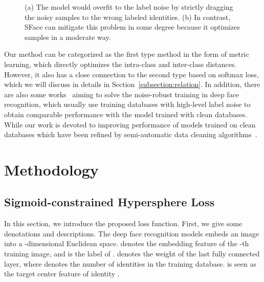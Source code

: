 \documentclass[journal,comsoc]{IEEEtran}
\begin{document}
\begin{figure}[htbp]
	\centering
	\caption{(a) The model would overfit to the label noise by strictly dragging the noisy samples to the wrong labeled identities. (b) In contrast, SFace can mitigate this problem in some degree because it optimizes samples in a moderate way.}
	\label{fig:intro_noise}
\end{figure}

Our method can be categorized as the first type method in the form of metric learning, which directly optimizes the intra-class and inter-class distances. However, it also has a close connection to the second type based on softmax loss, which we will discuss in details in Section~\ref{subsection:relation}. In addition, there are also some works~\cite{Hu_2019_CVPR,Wang_2019_ICCV} aiming to solve the noise-robust training in deep face recognition, which usually use training databases with high-level label noise to obtain comparable performance with the model trained with clean databases. While our work is devoted to improving performance of models trained on clean databases which have been refined by semi-automatic data cleaning algorithms~\cite{Yi2014CASIA,Cao18,deng2019arcface}.

\section{Methodology}
\label{sec:method}
\subsection{Sigmoid-constrained Hypersphere Loss}
In this section, we introduce the proposed loss function. First, we give some denotations and descriptions. The deep face recognition models embeds an image into a -dimensional Euclidean space.  denotes the embedding feature of the -th training image, and  is the label of .  denotes the weight of the last fully connected layer, where  denotes the number of identities in the training database.  is seen as the target center feature of identity . 
\end{document}
